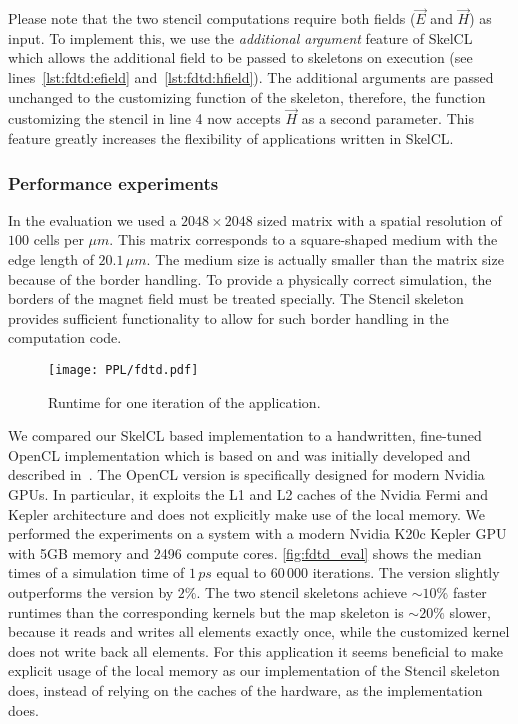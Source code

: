 Please note that the two stencil computations require both fields ($\vec{E}$ and $\vec{H}$) as input.
To implement this, we use the \emph{additional argument} feature of SkelCL which allows the additional field to be passed to skeletons on execution (see lines~\ref{lst:fdtd:efield} and~\ref{lst:fdtd:hfield}).
The additional arguments are passed unchanged to the customizing function of the skeleton, therefore, the function customizing the stencil in line 4 now accepts $\vec{H}$ as a second parameter.
This feature greatly increases the flexibility of applications written in SkelCL.

\subsubsection*{Performance experiments}

In the evaluation we used a $2048 \times 2048$ sized matrix with a spatial resolution of $100$ cells per $\mu m$.
This matrix corresponds to a square-shaped medium with the edge length of $20.1\,\mu m$.
The medium size is actually smaller than the matrix size because of the border handling.
To provide a physically correct simulation, the borders of the magnet field must be treated specially.
The Stencil skeleton provides sufficient functionality to allow for such border handling in the computation code.

\begin{figure}[t]
    \centering
    \texttt{[image: PPL/fdtd.pdf]}
    \caption{\small Runtime for one iteration of the \FDTD application.}
    \label{fig:fdtd_eval}
\end{figure}

We compared our SkelCL based implementation to a handwritten, fine-tuned OpenCL implementation which is based on \cite{Knitter2013} and was initially developed and described in~\cite{Haidl2011}.
The OpenCL version is specifically designed for modern Nvidia GPUs.
In particular, it exploits the L1 and L2 caches of the Nvidia Fermi and Kepler architecture and does not explicitly make use of the local memory.
We performed the experiments on a system with a modern Nvidia K20c Kepler GPU with 5GB memory and 2496 compute cores.
\autoref{fig:fdtd_eval} shows the median times of a simulation time of $1\,ps$ equal to $60\, 000$ iterations.
The \SkelCL version slightly outperforms the \OpenCL version by $2\%$.
The two stencil skeletons achieve ${\sim}10\%$ faster runtimes than the corresponding \OpenCL kernels but the map skeleton is ${\sim}20\%$ slower, because it reads and writes all elements exactly once, while the customized \OpenCL kernel does not write back all elements.
For this application it seems beneficial to make explicit usage of the local memory as our implementation of the Stencil skeleton does, instead of relying on the caches of the hardware, as the \OpenCL implementation does.

